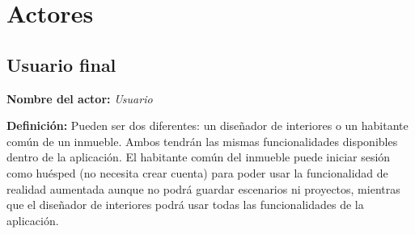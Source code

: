\section{Actores}

\subsection{Usuario final}
\textbf{Nombre del actor:} \textit{Usuario}\par
\textbf{Definición:} Pueden ser dos diferentes: un diseñador de interiores o un habitante común de un inmueble. Ambos tendrán las mismas funcionalidades disponibles dentro de la aplicación. El habitante común del inmueble puede iniciar sesión como huésped (no necesita crear cuenta) para poder usar la funcionalidad de realidad aumentada aunque no podrá guardar escenarios ni proyectos, mientras que el diseñador de interiores podrá usar todas las funcionalidades de la aplicación.